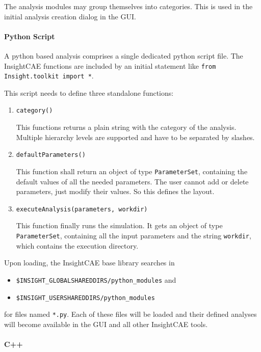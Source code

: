 The analysis modules may group themselves into categories. This is used in the initial analysis creation dialog in the GUI.

\paragraph{Python Script}

A python based analysis comprises a single dedicated python script file.
The InsightCAE functions are included by an initial statement like \verb!from Insight.toolkit import *!.

This script needs to define three standalone functions:
\begin{enumerate}
\item \verb!category()!

This functions returns a plain string with the category of the analysis. Multiple hierarchy levels are supported and have to be separated by slashes.

\item \verb!defaultParameters()!

This function shall return an object of type \texttt{ParameterSet}, containing the default values of all the needed parameters. The user cannot add or delete parameters, just modify their values. So this defines the layout.

\item \verb!executeAnalysis(parameters, workdir)!

This function finally runs the simulation.
It gets an object of type \verb!ParameterSet!, containing all the input parameters and the string \texttt{workdir}, which contains the execution directory.

\end{enumerate}

Upon loading, the InsightCAE base library searches in 
\begin{itemize}
\item \texttt{\$INSIGHT\_GLOBALSHAREDDIRS/python\_modules} and
\item \texttt{\$INSIGHT\_USERSHAREDDIRS/python\_modules}
\end{itemize}  for files named \texttt{*.py}. 
Each of these files will be loaded and their defined analyses will become available in the GUI and all other InsightCAE tools.


\paragraph{C++}

